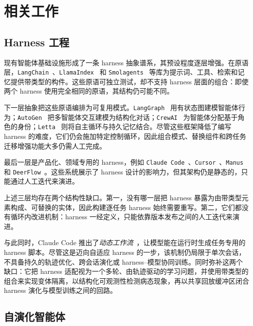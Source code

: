\section{相关工作}
\label{sec:related}

\subsection{Harness 工程}
\label{sec:related-harness-eng}

现有智能体基础设施形成了一条 harness 抽象谱系，其预设程度逐层增强。在原语层，\texttt{LangChain}~\cite{langchain}、\texttt{LlamaIndex}~\cite{Liu_LlamaIndex_2022} 和 \texttt{Smolagents}~\cite{smolagents} 等库为提示词、工具、检索和记忆提供带类型的构件。这些原语可独立测试，却不支持 harness 层面的组合：即使两个 harness 使用完全相同的原语，其结构仍可能不同。

下一层抽象把这些原语编排为可复用模式。\texttt{LangGraph}~\cite{langgraph} 用有状态图建模智能体行为；\texttt{AutoGen}~\cite{wu2024autogen} 把多智能体交互建模为结构化对话；\texttt{CrewAI}~\cite{moura2025crewai} 为智能体分配基于角色的身份；\texttt{Letta}~\cite{packer2023memgpt} 则将自主循环与持久记忆结合。尽管这些框架降低了编写 harness 的难度，它们仍会施加特定控制循环，因此组合模式、替换组件和跨任务迁移增强功能大多仍需人工完成。

最后一层是产品化、领域专用的 harness，例如 \texttt{Claude Code}~\cite{claudecode}、\texttt{Cursor}~\cite{cursor}、\texttt{Manus}~\cite{shen2025mind} 和 \texttt{DeerFlow}~\cite{deerflow}。这些系统展示了 harness 设计的影响力，但其架构仍是静态的，只能通过人工迭代来演进。

上述三层均存在两个结构性缺口。第一，没有哪一层把 harness 暴露为由带类型元素构成、可替换的实体，因此构建逐任务 harness 始终需要重写。第二，它们都没有循环内改进机制：harness 一经定义，只能依靠版本发布之间的人工迭代来演进。

与此同时，Claude Code 推出了\textit{动态工作流}~\cite{anthropic2026dynamicworkflows}，让模型能在运行时生成任务专用的 harness 脚本。尽管这是迈向自适应 harness 的一步，该机制仍局限于单次会话，不具备持久的轨迹优化、跨会话演化或 harness--模型协同训练。\ProjectName 同时弥补这两个缺口：它把 harness 适配视为一个多轮、由轨迹驱动的学习问题，并使用带类型的组合来实现变体隔离，以结构化可观测性检测病态现象，再以共享回放缓冲区闭合 harness 演化与模型训练之间的回路。

\subsection{自演化智能体}
\label{sec:related-self-evolving}

